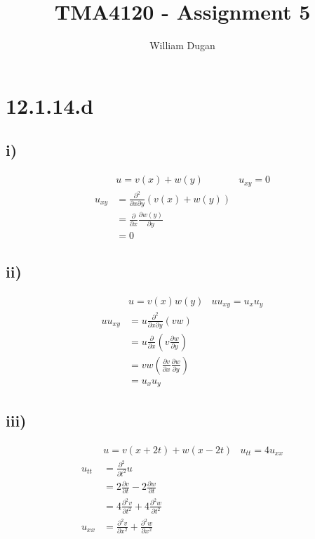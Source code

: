 \documentclass[11pt,a4paper]{article}
\begin{document}
\title{TMA4120 - Assignment 5} 
\author{William Dugan}

\maketitle

\section*{12.1.14.d}
\subsection*{i)}
\begin{align*}
    &u = v(x) + w(y) & u_{xy} = 0 \\
    u_{xy} &= \frac{\partial^2}{\partial x \partial y} (v(x) + w(y)) \\
    &= \frac{\partial}{\partial x} \frac{\partial w(y)}{\partial y} \\
    &= 0
\end{align*}

\subsection*{ii)}
\begin{align*}
    & u = v(x)w(y) & u u_{xy} = u_x u_y \\
    u u_{xy} &= u \frac{\partial^2}{\partial x \partial y} (vw) \\
    &= u \frac{\partial}{\partial x} \left(v \frac{\partial w}{\partial y}\right) \\
    &= vw \left(\frac{\partial v}{\partial x} \frac{\partial w}{\partial y} \right) \\
    &= u_x u_y
\end{align*}

\subsection*{iii)}
\begin{align*}
    & u = v(x+2t) + w(x-2t) & u_{tt} = 4 u_{xx} \\
    u_{tt} &= \frac{\partial^2}{\partial t^2} u \\
    &= 2 \frac{\partial v}{\partial t} - 2 \frac{\partial w}{\partial t} \\
    &= 4 \frac{\partial^2 v}{\partial t^2} + 4 \frac{\partial^2 w}{\partial t^2} \\
    u_{xx} &= \frac{\partial^2 v}{\partial x^2} + \frac{\partial^2 w}{\partial x^2}
\end{align*}
\end{document}
